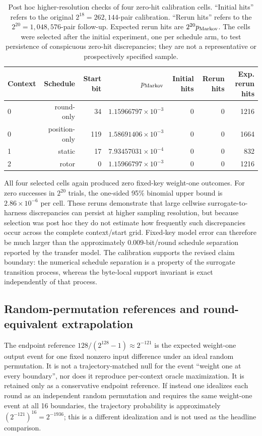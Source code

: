 \documentclass[cryptography,supfile,submit,oneauthor]{Definitions/mdpi}
\begin{document}
\begin{table}[h]
\centering\scriptsize
\caption{Post hoc higher-resolution checks of four zero-hit calibration cells. ``Initial hits'' refers to the original $2^{18}=262{,}144$-pair calibration. ``Rerun hits'' refers to the $2^{20}=1{,}048{,}576$-pair follow-up. Expected rerun hits are $2^{20}p_{\rm Markov}$. The cells were selected after the initial experiment, one per schedule arm, to test persistence of conspicuous zero-hit discrepancies; they are not a representative or prospectively specified sample.}\label{tab:zero-hit-reruns}
\begin{tabular}{lrrrrrr}
\toprule
Context & Schedule & Start bit & $p_{\rm Markov}$ & Initial hits & Rerun hits & Exp. rerun hits\\
\midrule
0 & round-only    & 34  & $1.15966797\times10^{-3}$ & 0 & 0 & 1216\\
0 & position-only & 119 & $1.58691406\times10^{-3}$ & 0 & 0 & 1664\\
1 & static        & 17  & $7.93457031\times10^{-4}$ & 0 & 0 & 832\\
2 & rotor         & 0   & $1.15966797\times10^{-3}$ & 0 & 0 & 1216\\
\bottomrule
\end{tabular}
\end{table}

All four selected cells again produced zero fixed-key weight-one outcomes. For zero successes in $2^{20}$ trials, the one-sided 95\% binomial upper bound is $2.86\times10^{-6}$ per cell. These reruns demonstrate that large cellwise surrogate-to-harness discrepancies can persist at higher sampling resolution, but because selection was post hoc they do not estimate how frequently such discrepancies occur across the complete context/start grid. Fixed-key model error can therefore be much larger than the approximately $0.009$-bit/round schedule separation reported by the transfer model. The calibration supports the revised claim boundary: the numerical schedule separation is a property of the surrogate transition process, whereas the byte-local support invariant is exact independently of that process.

\subsection{Random-permutation references and round-equivalent extrapolation}
The endpoint reference $128/(2^{128}-1)\approx2^{-121}$ is the expected weight-one output event for one fixed nonzero input difference under an ideal random permutation. It is not a trajectory-matched null for the event ``weight one at every boundary'', nor does it reproduce per-context oracle maximization. It is retained only as a conservative endpoint reference. If instead one idealizes each round as an independent random permutation and requires the same weight-one event at all 16 boundaries, the trajectory probability is approximately $(2^{-121})^{16}=2^{-1936}$; this is a different idealization and is not used as the headline comparison.
\end{document}

